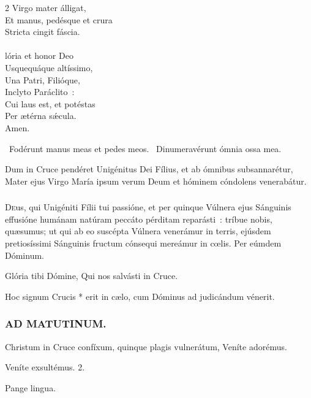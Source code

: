 \documentclass[9pt,twoside]{extarticle}
\begin{document}
\begin{multicols}{2}
Virgo mater álligat,\\
Et manus, pedésque et crura\\
Stricta cingit fáscia.\\
\\
lória et honor Deo\\
Usquequáque altíssimo,\\
Una Patri, Filióque,\\
Inclyto Paráclito~:\\
Cui laus est, et potéstas\\
Per ætérna sǽcula.\\
Amen.
\begin{tightlist}{}
\item {}~Fodérunt manus meas et pedes meos. ~Dinumeravérunt ómnia ossa mea.
\item {} Dum in Cruce pendéret Unigénitus Dei Fílius, et ab ómnibus subsannarétur, Mater ejus Virgo María ipsum verum Deum et hóminem cóndolens venerabátur.
\end{tightlist}

\subsubsection*{\center {}}
\lettrine{D}eus, qui Unigéniti Fílii tui passióne, et per quinque Vúlnera ejus Sánguinis effusióne humánam natúram peccáto pérditam reparásti~: tríbue nobis, quæsumus; ut qui ab eo suscépta Vúlnera venerámur in terris, ejúsdem pretiosíssimi Sánguinis fructum cónsequi mereámur in cœlis. Per eúmdem Dóminum.

\begin{tightlist}{}
\item {} Glória tibi Dómine, Qui nos salvásti in Cruce.
\item {} Hoc signum Crucis * erit in cælo, cum Dóminus ad judicándum vénerit.
\end{tightlist}

\subsubsection*{\center \textsc{AD MATUTINUM.}}
\begin{tightlist}{}
\item {} Christum in Cruce confíxum, quinque plagis vulnerátum, \textred{*} Veníte adorémus.
\item {} Veníte exsultémus. 2.
\item {} Pange lingua. 
\end{tightlist}


\end{multicols}
\end{document}
